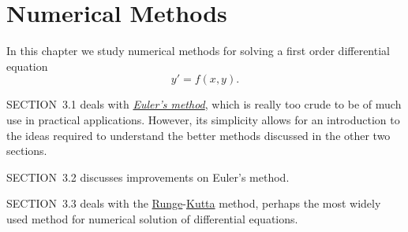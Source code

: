 \chapter{Numerical Methods}

\noindent
In this chapter we study numerical methods for solving a first order differential equation
\[
  y'=f(x,y).
\]

\medskip
\noindent
SECTION~3.1 deals with \href{https://mathshistory.st-andrews.ac.uk/Biographies/Euler/}{\color{blue}
\it Euler's method}, which is really too crude to be of much use in practical applications. However,
its simplicity allows for an introduction to the ideas required to understand the better methods
discussed in the other two sections.

\medskip
\noindent
SECTION~3.2 discusses improvements on Euler's method.

\medskip
\noindent
SECTION~3.3 deals with the
\href{https://mathshistory.st-andrews.ac.uk/Biographies/Runge/}{Runge\color{blue}}-\href{https://mathshistory.st-andrews.ac.uk/Biographies/Kutta/}{\color{blue}Kutta}
method, perhaps the most widely used method for numerical solution of differential equations.

\newpage



\setcounter{table}{0}

\setcounter{table}{0}

